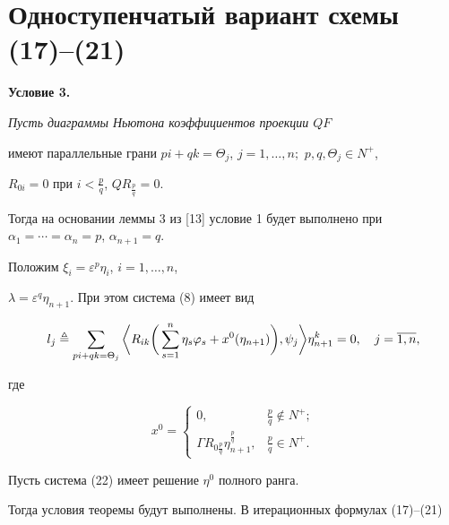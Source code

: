 \section{Одноступенчатый вариант схемы (17)--(21)}





{\bf Условие 3.} {\it Пусть диаграммы Ньютона коэффициентов проекции $QF$


имеют параллельные грани $pi+qk = \Theta_j$, $j=1,\dotsc,n;$ $p, q,


\Theta_j \in N^+$,


$R_{0i} = 0$ при $i<\frac {p}{q}$, $QR_{\frac pq}=0$.}





Тогда на основании леммы 3 из [13] условие 1 будет выполнено при $\alpha_1


= \dotsb = \alpha_n = p$, $\alpha_{n+1} = q$.





Положим $\xi_i = \varepsilon^p\eta_i$, $i=1,\dotsc,n$,


$\lambda = \varepsilon^q\eta_{n+1}$. При этом система (8) имеет вид


\begin{equation}


l_j \triangleq


\sum_{pi+qk=\Theta_j}\bigg\la R_{ik}\bigg(\sum^n_{s=1}\eta_s\varphi_s +


x^0(\eta_{n+1})\bigg), \psi_j\bigg\ra\eta^k_{n+1} = 0,\quad


j=\overline{1,n},


\end{equation}


где


$$


x^0 =\begin{cases}


0, & \frac pq \notin N^+; \\


\Gamma R_{0\frac pq}\eta^{\frac pq}_{n+1}, &


\frac pq \in N^+.


\end{cases}


$$


Пусть система (22) имеет решение $\eta^0$ полного ранга.


Тогда условия теоремы будут выполнены. В итерационных формулах (17)--(21)



